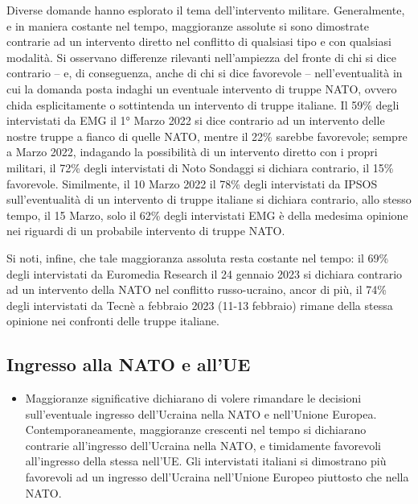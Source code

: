 \documentclass[
]{book}
\providecommand{\tightlist}{%
  \setlength{\itemsep}{0pt}\setlength{\parskip}{0pt}}
\begin{document}
Diverse domande hanno esplorato il tema dell'intervento militare. Generalmente, e in maniera costante nel tempo, maggioranze assolute si sono dimostrate contrarie ad un intervento diretto nel conflitto di qualsiasi tipo e con qualsiasi modalità. Si osservano differenze rilevanti nell'ampiezza del fronte di chi si dice contrario -- e, di conseguenza, anche di chi si dice favorevole -- nell'eventualità in cui la domanda posta indaghi un eventuale intervento di truppe NATO, ovvero chida esplicitamente o sottintenda un intervento di truppe italiane. Il 59\% degli intervistati da EMG il 1° Marzo 2022 si dice contrario ad un intervento delle nostre truppe a fianco di quelle NATO, mentre il 22\% sarebbe favorevole; sempre a Marzo 2022, indagando la possibilità di un intervento diretto con i propri militari, il 72\% degli intervistati di Noto Sondaggi si dichiara contrario, il 15\% favorevole. Similmente, il 10 Marzo 2022 il 78\% degli intervistati da IPSOS sull'eventualità di un intervento di truppe italiane si dichiara contrario, allo stesso tempo, il 15 Marzo, solo il 62\% degli intervistati EMG è della medesima opinione nei riguardi di un probabile intervento di truppe NATO.

Si noti, infine, che tale maggioranza assoluta resta costante nel tempo: il 69\% degli intervistati da Euromedia Research il 24 gennaio 2023 si dichiara contrario ad un intervento della NATO nel conflitto russo-ucraino, ancor di più, il 74\% degli intervistati da Tecnè a febbraio 2023 (11-13 febbraio) rimane della stessa opinione nei confronti delle truppe italiane.

\hypertarget{ingresso-alla-nato-e-allue}{%
\subsection{Ingresso alla NATO e all'UE}\label{ingresso-alla-nato-e-allue}}

\begin{itemize}
\tightlist
\item
  Maggioranze significative dichiarano di volere rimandare le decisioni sull'eventuale ingresso dell'Ucraina nella NATO e nell'Unione Europea. Contemporaneamente, maggioranze crescenti nel tempo si dichiarano contrarie all'ingresso dell'Ucraina nella NATO, e timidamente favorevoli all'ingresso della stessa nell'UE. Gli intervistati italiani si dimostrano più favorevoli ad un ingresso dell'Ucraina nell'Unione Europeo piuttosto che nella NATO.
\end{itemize}
\end{document}
